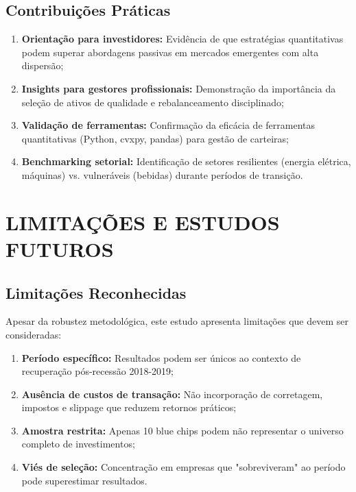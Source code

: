 \subsection{Contribuições Práticas}

\begin{enumerate}
    \item \textbf{Orientação para investidores:} Evidência de que estratégias quantitativas podem superar abordagens passivas em mercados emergentes com alta dispersão;
    
    \item \textbf{Insights para gestores profissionais:} Demonstração da importância da seleção de ativos de qualidade e rebalanceamento disciplinado;
    
    \item \textbf{Validação de ferramentas:} Confirmação da eficácia de ferramentas quantitativas (Python, cvxpy, pandas) para gestão de carteiras;
    
    \item \textbf{Benchmarking setorial:} Identificação de setores resilientes (energia elétrica, máquinas) vs. vulneráveis (bebidas) durante períodos de transição.
\end{enumerate}

\section{LIMITAÇÕES E ESTUDOS FUTUROS}

\subsection{Limitações Reconhecidas}

Apesar da robustez metodológica, este estudo apresenta limitações que devem ser consideradas:

\begin{enumerate}
    \item \textbf{Período específico:} Resultados podem ser únicos ao contexto de recuperação pós-recessão 2018-2019;
    
    \item \textbf{Ausência de custos de transação:} Não incorporação de corretagem, impostos e slippage que reduzem retornos práticos;
    
    \item \textbf{Amostra restrita:} Apenas 10 blue chips podem não representar o universo completo de investimentos;
    
    \item \textbf{Viés de seleção:} Concentração em empresas que "sobreviveram" ao período pode superestimar resultados.
\end{enumerate}

